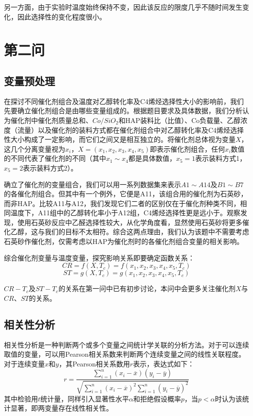 \documentclass{article}
\begin{document}
	另一方面，由于实验时温度始终保持不变，因此该反应的限度几乎不随时间发生变化，因此选择性的变化程度很小。

	\section{第二问}
	\subsection{变量预处理}
	在探讨不同催化剂组合及温度对乙醇转化率及C4烯烃选择性大小的影响前，我们先要确立催化剂组合是由哪些变量组成的。根据题目要求及具体数据，我们分析认为催化剂中催化剂质量总和、$Co/SiO_2$和HAP装料比（比值）、Co负载量、乙醇浓度（流量）以及催化剂的装料方式都在催化剂组合中对乙醇转化率及C4烯烃选择性大小构成了一定影响，而它们之间又是相互独立的。将催化剂总体视为变量$X$，这几个分离变量视为$x_i$，$X=(x_1,x_2,x_3,x_4,x_5)$即表示催化剂组合，任何$x_i$数值的不同代表了催化剂的不同（其中$x_1\sim x_4$都是具体数值，$x_5=1$表示装料方式1，$x_5=2$表示装料方式2）。
	
	确立了催化剂的变量组合，我们可以用一系列数据集来表示$A1\sim A14$及$B1\sim B7$的各催化剂组合。但其中有一个例外，它便是A11，该组合用的催化剂为石英砂，而非HAP。比较A11与A12，我们发现它们二者的区别仅在于催化剂种类不同，相同温度下，A11组中的乙醇转化率小于A12组，C4烯烃选择性更是远小于。观察发现，使用石英砂反应中乙醛选择性较大，从化学角度看，显然使用石英砂将更多催化乙醇，这与我们的目标不太相符。综合这两点理由，我们认为该题中不需要考虑石英砂作催化剂，仅需考虑以HAP为催化剂时的各催化剂组合变量的相关影响。
	
	综合催化剂变量与温度变量，探究影响关系即要确定函数关系：
	\begin{equation}
		CR=f(X,T_c)=f(x_1,x_2,x_3,x_4,x_5,T_c)
	\end{equation}
	\begin{equation}
		ST=g(X,T_c)=g(x_1,x_2,x_3,x_4,x_5,T_c)
	\end{equation}

	$CR-T_c$及$ST-T_c$的关系在第一问中已有初步讨论，本问中会更多关注催化剂$X$与$CR$、$ST$的关系。
	\subsection{相关性分析}
	相关性分析是一种判断两个或多个变量之间统计学关联的分析方法。对于可以连续取值的变量，可以用Pearson相关系数来判断两个连续变量之间的线性关联程度。对于连续变量$x$和$y$，其Pearson相关系数用$r$表示，表达式如下：
	\begin{equation}
		r=\frac{\sum_{i=1}^n(x_i-\overline{x})(y_i-\overline{y})}{\sqrt{\sum_{i=1}^n(x_i-\overline{x})^2\sum_{i=1}^n(y_i-\overline{y})^2}}
	\end{equation}
	其中检验用$t$统计量，同样引入显著性水平$\alpha$和拒绝假设概率$p$，当$p<\alpha$时认为该统计显著，即两变量存在线性相关性。
	
\end{document}

